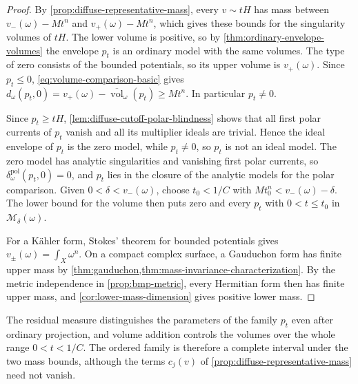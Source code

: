 \begin{proof}
By \cref{prop:diffuse-representative-mass}, every $v\sim tH$ has mass between $v_-(\omega)-Mt^n$ and $v_+(\omega)-Mt^n$, which gives these bounds for the singularity volumes of $tH$. The lower volume is positive, so by \cref{thm:ordinary-envelope-volumes} the envelope $p_t$ is an ordinary model with the same volumes. The type of zero consists of the bounded potentials, so its upper volume is $v_+(\omega)$. Since $p_t\leq0$, \eqref{eq:volume-comparison-basic} gives
$d_\omega(p_t,0)=v_+(\omega)-\overline{\operatorname{vol}}_\omega(p_t)\geq Mt^n$.
In particular $p_t\ne0$.

Since $p_t\geq tH$, \cref{lem:diffuse-cutoff-polar-blindness} shows that all first polar currents of $p_t$ vanish and all its multiplier ideals are trivial. Hence the ideal envelope of $p_t$ is the zero model, while $p_t\ne0$, so $p_t$ is not an ideal model. The zero model has analytic singularities and vanishing first polar currents, so $\delta_\omega^{\mathrm{pol}}(p_t,0)=0$, and $p_t$ lies in the closure of the analytic models for the polar comparison. Given $0<\delta<v_-(\omega)$, choose $t_0<1/C$ with $Mt_0^n<v_-(\omega)-\delta$. The lower bound for the volume then puts zero and every $p_t$ with $0<t\leq t_0$ in $\mathcal M_\delta(\omega)$.

For a K\"ahler form, Stokes' theorem for bounded potentials gives $v_\pm(\omega)=\int_X\omega^n$. On a compact complex surface, a Gauduchon form has finite upper mass by \cref{thm:gauduchon,thm:mass-invariance-characterization}. By the metric independence in \cref{prop:bmp-metric}, every Hermitian form then has finite upper mass, and \cref{cor:lower-mass-dimension} gives positive lower mass.
\end{proof}

The residual measure distinguishes the parameters of the family $p_t$ even after ordinary projection, and volume addition controls the volumes over the whole range $0<t<1/C$. The ordered family is therefore a complete interval under the two mass bounds, although the terms $c_j(v)$ of \cref{prop:diffuse-representative-mass} need not vanish.

